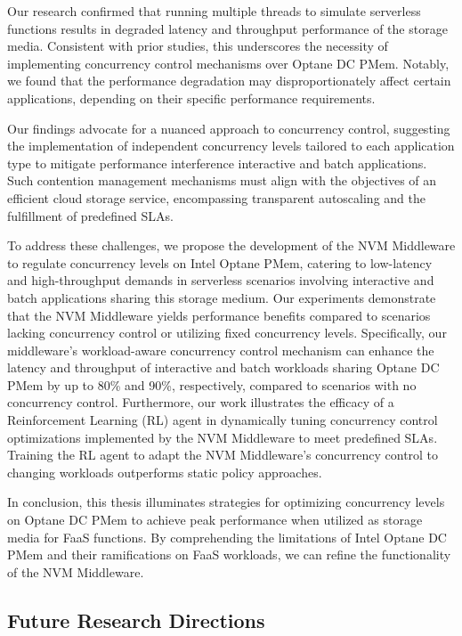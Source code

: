 Our research confirmed that running multiple threads to simulate serverless functions results in degraded latency and throughput performance of the storage media. Consistent with prior studies, this underscores the necessity of implementing concurrency control mechanisms over Optane DC PMem. Notably, we found that the performance degradation may disproportionately affect certain applications, depending on their specific performance requirements.

Our findings advocate for a nuanced approach to concurrency control, suggesting the implementation of independent concurrency levels tailored to each application type to mitigate performance interference interactive and batch applications. Such contention management mechanisms must align with the objectives of an efficient cloud storage service, encompassing transparent autoscaling and the fulfillment of predefined SLAs.

To address these challenges, we propose the development of the NVM Middleware to regulate concurrency levels on Intel Optane PMem, catering to low-latency and high-throughput demands in serverless scenarios involving interactive and batch applications sharing this storage medium. Our experiments demonstrate that the NVM Middleware yields performance benefits compared to scenarios lacking concurrency control or utilizing fixed concurrency levels. Specifically, our middleware's workload-aware concurrency control mechanism can enhance the latency and throughput of interactive and batch workloads sharing Optane DC PMem by up to 80\% and 90\%, respectively, compared to scenarios with no concurrency control. Furthermore, our work illustrates the efficacy of a Reinforcement Learning (RL) agent in dynamically tuning concurrency control optimizations implemented by the NVM Middleware to meet predefined SLAs. Training the RL agent to adapt the NVM Middleware's concurrency control to changing workloads outperforms static policy approaches.

In conclusion, this thesis illuminates strategies for optimizing concurrency levels on Optane DC PMem to achieve peak performance when utilized as storage media for FaaS functions. By comprehending the limitations of Intel Optane DC PMem and their ramifications on FaaS workloads, we can refine the functionality of the NVM Middleware.

\subsection*{Future Research Directions}

